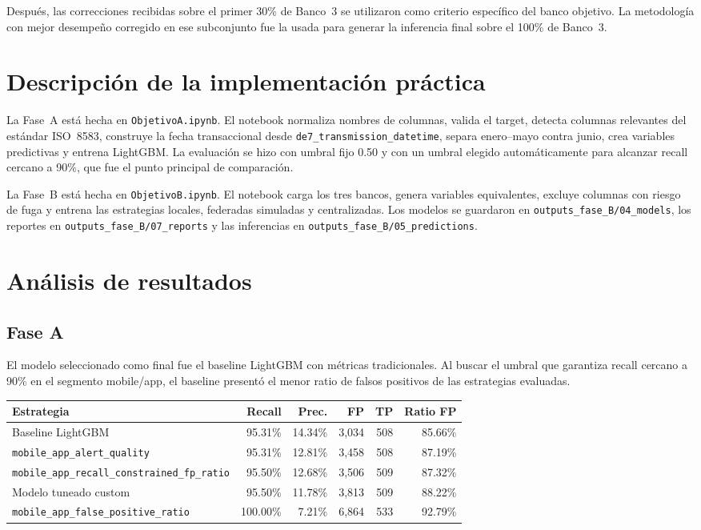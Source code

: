 \documentclass[10pt,a4paper]{article}
\begin{document}
Después, las correcciones recibidas sobre el primer 30\% de Banco~3 se utilizaron
como criterio específico del banco objetivo. La metodología con mejor desempeño corregido
en ese subconjunto fue la usada para generar la inferencia final sobre el 100\% de Banco~3.

\section{Descripción de la implementación práctica}

La Fase~A está hecha en \texttt{ObjetivoA.ipynb}. El notebook normaliza nombres
de columnas, valida el target, detecta columnas relevantes del estándar ISO~8583,
construye la fecha transaccional desde \texttt{de7\_transmission\_datetime}, separa
enero--mayo contra junio, crea variables predictivas y entrena LightGBM. La evaluación
se hizo con umbral fijo 0.50 y con un umbral elegido automáticamente para alcanzar
recall cercano a 90\%, que fue el punto principal de comparación.

La Fase~B está hecha en \texttt{ObjetivoB.ipynb}. El notebook carga los tres
bancos, genera variables equivalentes,
excluye columnas con riesgo de fuga y entrena las estrategias locales, federadas
simuladas y centralizadas. Los modelos se guardaron en
\nolinkurl{outputs_fase_B/04_models}, los reportes en
\nolinkurl{outputs_fase_B/07_reports} y las inferencias en
\nolinkurl{outputs_fase_B/05_predictions}.

\section{Análisis de resultados}

\subsection{Fase A}

El modelo seleccionado como final fue el baseline LightGBM con métricas tradicionales.
Al buscar el umbral que garantiza recall cercano a 90\% en el segmento mobile/app,
el baseline presentó el menor ratio de falsos positivos de las estrategias evaluadas.

\begin{center}
\scriptsize
\begin{tabular}{p{}rrrrr}
\toprule
\textbf{Estrategia} & \textbf{Recall} & \textbf{Prec.} & \textbf{FP} & \textbf{TP} & \textbf{Ratio FP} \\
\midrule
Baseline LightGBM & 95.31\% & 14.34\% & 3{,}034 & 508 & 85.66\% \\
\texttt{mobile\_app\_alert\_quality} & 95.31\% & 12.81\% & 3{,}458 & 508 & 87.19\% \\
\texttt{mobile\_app\_recall\_constrained\_fp\_ratio} & 95.50\% & 12.68\% & 3{,}506 & 509 & 87.32\% \\
Modelo tuneado custom & 95.50\% & 11.78\% & 3{,}813 & 509 & 88.22\% \\
\texttt{mobile\_app\_false\_positive\_ratio} & 100.00\% & 7.21\% & 6{,}864 & 533 & 92.79\% \\
\bottomrule
\end{tabular}
\end{center}
\end{document}
